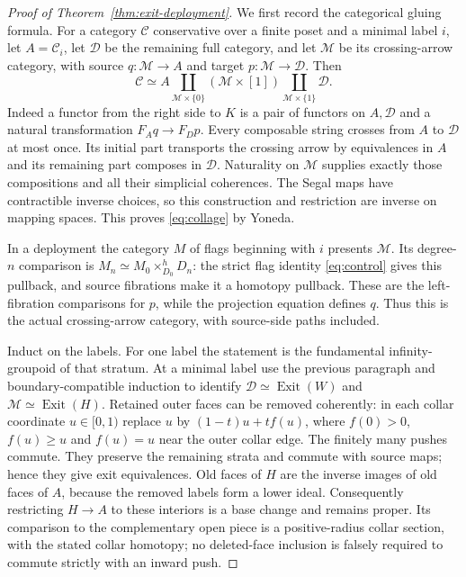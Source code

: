 \documentclass[11pt,a4paper]{article}
\theoremstyle{definition}
\begin{document}
\begin{proof}[Proof of Theorem~\ref{thm:exit-deployment}]
We first record the categorical gluing formula. For a category
$\mathcal C$ conservative over a finite poset and a minimal label $i$,
let $A=\mathcal C_i$, let $\mathcal D$ be the remaining full category,
and let $\mathcal M$ be its crossing-arrow category, with source
$q:\mathcal M\to A$ and target $p:\mathcal M\to\mathcal D$.
Then
\begin{equation}\label{eq:collage}
 \mathcal C\simeq A\coprod_{\mathcal M\times\{0\}}
 (\mathcal M\times[1])
 \coprod_{\mathcal M\times\{1\}}\mathcal D.
\end{equation}
Indeed a functor from the right side to $K$ is a pair of functors on
$A,\mathcal D$ and a natural transformation $F_Aq\to F_Dp$.
Every composable string crosses from $A$ to $\mathcal D$ at most once.
Its initial part transports the crossing arrow by equivalences in
$A$ and its remaining part composes in $\mathcal D$. Naturality on
$\mathcal M$ supplies exactly those compositions and all their
simplicial coherences. The Segal maps have contractible inverse choices,
so this construction and restriction are inverse on mapping spaces.
This proves \eqref{eq:collage} by Yoneda.

In a deployment the category $M$ of flags beginning with $i$ presents
$\mathcal M$. Its degree-$n$ comparison is
$M_n\simeq M_0\times^h_{D_0}D_n$: the strict flag identity
\eqref{eq:control} gives this pullback, and source fibrations make it
a homotopy pullback. These are the left-fibration comparisons for
$p$, while the projection equation defines $q$. Thus this is the
actual crossing-arrow category, with source-side paths included.

Induct on the labels. For one label the statement is the fundamental
infinity-groupoid of that stratum. At a minimal label use the previous
paragraph and boundary-compatible induction to identify
$\mathcal D\simeq\operatorname{Exit}(W)$ and
$\mathcal M\simeq\operatorname{Exit}(H)$.
Retained outer faces can be removed coherently: in each collar
coordinate $u\in[0,1)$ replace $u$ by $(1-t)u+tf(u)$, where $f(0)>0$,
$f(u)\ge u$ and $f(u)=u$ near the outer collar edge. The finitely many
pushes commute. They preserve the remaining strata and commute with
source maps; hence they give exit equivalences. Old faces of $H$ are
the inverse images of old faces of $A$, because the removed labels form
a lower ideal. Consequently restricting $H\to A$ to these interiors
is a base change and remains proper. Its comparison to the complementary
open piece is a positive-radius collar section, with the stated collar
homotopy; no deleted-face inclusion is falsely required to commute
strictly with an inward push.


\end{proof}
\end{document}
